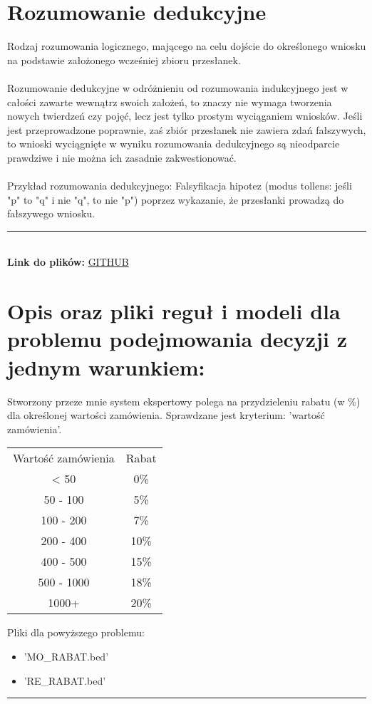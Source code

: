 \documentclass[a4paper,12pt]{article}
\newcommand{\linia}{\rule{\linewidth}{0.5pt}}
\theoremstyle{mytheor}
\begin{document}
\section*{Rozumowanie dedukcyjne}
Rodzaj rozumowania logicznego, mającego na celu dojście do określonego wniosku na podstawie założonego wcześniej zbioru przesłanek.
\\\\
Rozumowanie dedukcyjne w odróżnieniu od rozumowania indukcyjnego jest w całości zawarte wewnątrz swoich założeń, to znaczy nie wymaga tworzenia nowych twierdzeń czy pojęć, lecz jest tylko prostym wyciąganiem wniosków. Jeśli jest przeprowadzone poprawnie, zaś zbiór przesłanek nie zawiera zdań fałszywych, to wnioski wyciągnięte w wyniku rozumowania dedukcyjnego są nieodparcie prawdziwe i nie można ich zasadnie zakwestionować. 
\\
\\
Przykład rozumowania dedukcyjnego: Falsyfikacja hipotez (modus tollens: jeśli "p" to "q" i nie "q", to nie "p") poprzez wykazanie, że przesłanki  prowadzą  do  fałszywego  wniosku.
\\\linia\\
\textbf{Link do plików:} \textcolor{red}{\href{https://github.com/bvdzynski/up_ai-lab/tree/master/lab1_project}{GITHUB}}
\section* {Opis oraz pliki reguł i modeli dla problemu podejmowania decyzji z jednym warunkiem:}
Stworzony przeze mnie system ekspertowy polega na przydzieleniu rabatu (w \%) dla określonej wartości zamówienia. Sprawdzane jest kryterium: 'wartość zamówienia'.
\newline
\newline
\begin{tabular}{|c|c|}
    Wartość zamówienia & Rabat \\
   < 50&0\%\\
   50 - 100&5\%\\
   100 - 200&7\%\\
   200 - 400&10\%\\
   400 - 500&15\%\\
   500 - 1000&18\%\\
   1000+&20\%\\
\end{tabular}
\newline

Pliki dla powyższego problemu:
\begin{itemize}
    \item 'MO\_RABAT.bed'
    \item 'RE\_RABAT.bed'
\end{itemize}
\linia
\end{document}
